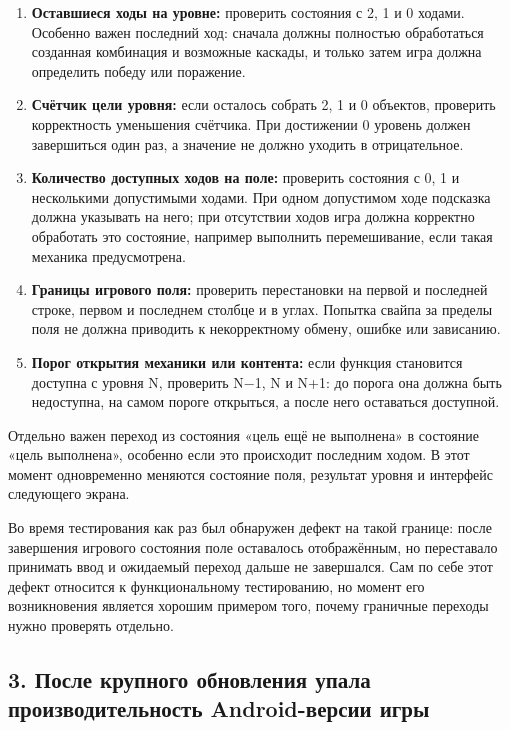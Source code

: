 \documentclass{ZGJournalArticle_2026}
\providecommand{\tightlist}{%
  \setlength{\itemsep}{0pt}\setlength{\parskip}{0pt}}
\begin{document}
\begin{enumerate}
\def\labelenumi{\arabic{enumi}.}
\tightlist
\item
  \textbf{Оставшиеся ходы на уровне:} проверить состояния с 2, 1 и 0
  ходами. Особенно важен последний ход: сначала должны полностью
  обработаться созданная комбинация и возможные каскады, и только затем
  игра должна определить победу или поражение.
\item
  \textbf{Счётчик цели уровня:} если осталось собрать 2, 1 и 0 объектов,
  проверить корректность уменьшения счётчика. При достижении 0 уровень
  должен завершиться один раз, а значение не должно уходить в
  отрицательное.
\item
  \textbf{Количество доступных ходов на поле:} проверить состояния с 0,
  1 и несколькими допустимыми ходами. При одном допустимом ходе
  подсказка должна указывать на него; при отсутствии ходов игра должна
  корректно обработать это состояние, например выполнить перемешивание,
  если такая механика предусмотрена.
\item
  \textbf{Границы игрового поля:} проверить перестановки на первой и
  последней строке, первом и последнем столбце и в углах. Попытка свайпа
  за пределы поля не должна приводить к некорректному обмену, ошибке или
  зависанию.
\item
  \textbf{Порог открытия механики или контента:} если функция становится
  доступна с уровня N, проверить N−1, N и N+1: до порога она должна быть
  недоступна, на самом пороге открыться, а после него оставаться
  доступной.
\end{enumerate}

Отдельно важен переход из состояния «цель ещё не выполнена» в состояние
«цель выполнена», особенно если это происходит последним ходом. В этот
момент одновременно меняются состояние поля, результат уровня и
интерфейс следующего экрана.

Во время тестирования как раз был обнаружен дефект на такой границе:
после завершения игрового состояния поле оставалось отображённым, но
переставало принимать ввод и ожидаемый переход дальше не завершался. Сам
по себе этот дефект относится к функциональному тестированию, но момент
его возникновения является хорошим примером того, почему граничные
переходы нужно проверять отдельно.

\newpage

\subsection{3. После крупного обновления упала производительность
Android-версии
игры}\label{ux43fux43eux441ux43bux435-ux43aux440ux443ux43fux43dux43eux433ux43e-ux43eux431ux43dux43eux432ux43bux435ux43dux438ux44f-ux443ux43fux430ux43bux430-ux43fux440ux43eux438ux437ux432ux43eux434ux438ux442ux435ux43bux44cux43dux43eux441ux442ux44c-android-ux432ux435ux440ux441ux438ux438-ux438ux433ux440ux44b}
\end{document}
